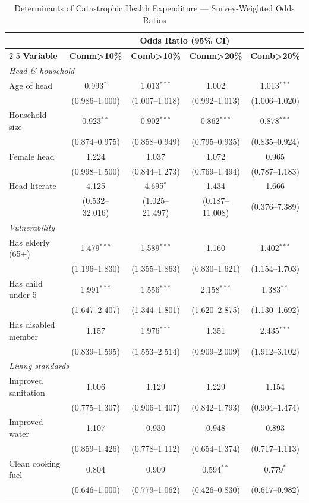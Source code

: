 \begin{table}[htbp]
\centering
\caption{Determinants of Catastrophic Health Expenditure --- Survey-Weighted Odds Ratios}
\label{tab:logit}
\footnotesize
\begin{tabular}{lcccc}
\hline\hline
 & \multicolumn{4}{c}{\textbf{Odds Ratio (95\% CI)}} \\
\cmidrule(lr){2-5}
\textbf{Variable} & \textbf{Comm>10\%} & \textbf{Comb>10\%} & \textbf{Comm>20\%} & \textbf{Comb>20\%} \\
\hline
\multicolumn{5}{l}{\textit{Head \& household}} \\
\quad Age of head & 0.993$^{*}$ & 1.013$^{***}$ & 1.002 & 1.013$^{***}$ \\
\quad & (0.986--1.000) & (1.007--1.018) & (0.992--1.013) & (1.006--1.020) \\
\quad Household size & 0.923$^{**}$ & 0.902$^{***}$ & 0.862$^{***}$ & 0.878$^{***}$ \\
\quad & (0.874--0.975) & (0.858--0.949) & (0.795--0.935) & (0.835--0.924) \\
\quad Female head & 1.224 & 1.037 & 1.072 & 0.965 \\
\quad & (0.998--1.500) & (0.844--1.273) & (0.769--1.494) & (0.787--1.183) \\
\quad Head literate & 4.125 & 4.695$^{*}$ & 1.434 & 1.666 \\
\quad & (0.532--32.016) & (1.025--21.497) & (0.187--11.008) & (0.376--7.389) \\

\multicolumn{5}{l}{\textit{Vulnerability}} \\
\quad Has elderly (65+) & 1.479$^{***}$ & 1.589$^{***}$ & 1.160 & 1.402$^{***}$ \\
\quad & (1.196--1.830) & (1.355--1.863) & (0.830--1.621) & (1.154--1.703) \\
\quad Has child under 5 & 1.991$^{***}$ & 1.556$^{***}$ & 2.158$^{***}$ & 1.383$^{**}$ \\
\quad & (1.647--2.407) & (1.344--1.801) & (1.620--2.875) & (1.130--1.692) \\
\quad Has disabled member & 1.157 & 1.976$^{***}$ & 1.351 & 2.435$^{***}$ \\
\quad & (0.839--1.595) & (1.553--2.514) & (0.909--2.009) & (1.912--3.102) \\

\multicolumn{5}{l}{\textit{Living standards}} \\
\quad Improved sanitation & 1.006 & 1.129 & 1.229 & 1.154 \\
\quad & (0.775--1.307) & (0.906--1.407) & (0.842--1.793) & (0.904--1.474) \\
\quad Improved water & 1.107 & 0.930 & 0.948 & 0.893 \\
\quad & (0.859--1.426) & (0.778--1.112) & (0.654--1.374) & (0.717--1.113) \\
\quad Clean cooking fuel & 0.804 & 0.909 & 0.594$^{**}$ & 0.779$^{*}$ \\
\quad & (0.646--1.000) & (0.779--1.062) & (0.426--0.830) & (0.617--0.982) \\


\end{tabular}
\end{table}
